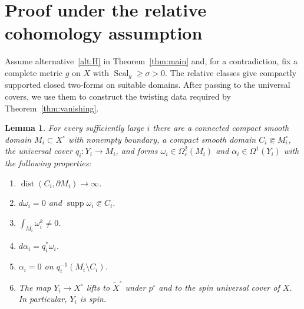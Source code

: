 \documentclass[12pt,reqno]{amsart}
\numberwithin{equation}{section}
\newtheorem{lemma}[theorem]{Lemma}
\theoremstyle{definition}
\newcommand{\Sc}{\operatorname{Scal}}
\newcommand{\supp}{\operatorname{supp}}
\newcommand{\dist}{\operatorname{dist}}
\begin{document}
\vspace{0.5cm}


\section{Proof under the relative cohomology assumption}\label{sec:H}

Assume alternative~\ref{alt:H} in Theorem~\ref{thm:main} and, for a contradiction, fix a
complete metric $g$ on $X$ with $\Sc_g\geq\sigma>0$.  The relative classes give compactly supported
closed two-forms on suitable domains. After passing to the
universal covers, we use them to construct the twisting data required by Theorem~\ref{thm:vanishing}.


\begin{lemma}\label{lem:H-forms}
For every sufficiently large $i$ there are a connected compact smooth
domain $M_i\subset X^\circ$ with nonempty boundary, a compact smooth
domain $C_i\Subset M_i^\circ$, the universal cover
$q_i:Y_i\to M_i$, and forms
$\omega_i\in\Omega_c^2(M_i)$ and $\alpha_i\in\Omega^1(Y_i)$ with the
following properties:
\begin{enumerate}[label=\textup{(H\arabic*)},ref=\textup{(H\arabic*)},
                  leftmargin=3.4em]
\item\label{H:domains}
$\dist(C_i,\partial M_i)\to\infty$.

\item\label{H:closed-support}
$d\omega_i=0$ and $\supp\omega_i\Subset C_i$.

\item\label{H:pairing}
$\displaystyle\int_{M_i}\omega_i^k\ne0$.

\item\label{H:primitive}
$d\alpha_i=q_i^*\omega_i$.

\item\label{H:exterior-zero}
$\alpha_i=0$ on $q_i^{-1}(M_i\setminus C_i)$.

\item\label{H:lifts}
The map $Y_i\to X^\circ$ lifts to $\widetilde X^\circ$ under
$p^\circ$ and to the spin universal cover of $X$.  In particular,
$Y_i$ is spin.
\end{enumerate}
\end{lemma}
\end{document}
